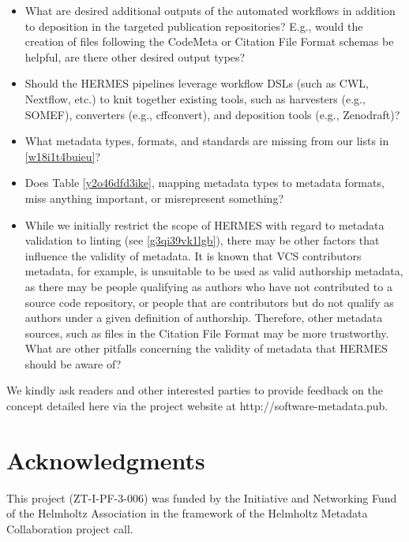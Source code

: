 \documentclass{article}
\begin{document}
\begin{itemize}  
\item What are desired additional outputs of the automated workflows in addition to deposition in the targeted publication repositories? E.g., would the creation of files following the CodeMeta or Citation File Format schemas be helpful, are there other desired output types?


\item Should the HERMES pipelines leverage workflow DSLs (such as CWL, Nextflow, etc.) to knit together existing tools, such as harvesters (e.g., SOMEF), converters (e.g., cffconvert), and deposition tools (e.g., Zenodraft)?


\item What metadata types, formats, and standards are missing from our lists in \ref{w18i1t4buieu}?


\item Does Table \ref{y2o46dfd3ike}, mapping metadata types to metadata formats, miss anything important, or misrepresent something?


\item While we initially restrict the scope of HERMES with regard to metadata validation to linting (see \ref{g3qi39vk1lgb}), there may be other factors that influence the validity of metadata. It is known that VCS contributors metadata, for example, is unsuitable to be used as valid authorship metadata, as there may be people qualifying as authors who have not contributed to a source code repository, or people that are contributors but do not qualify as authors under a given definition of authorship. Therefore, other metadata sources, such as files in the Citation File Format may be more trustworthy. What are other pitfalls concerning the validity of metadata that HERMES should be aware of?


\end{itemize}We kindly ask readers and other interested parties to provide feedback on the concept detailed here via the project website at http://software-metadata.pub.



\section{Acknowledgments}\label{giyko1j}
This project (ZT-I-PF-3-006) was funded by the Initiative and Networking Fund of the Helmholtz Association in the framework of the Helmholtz Metadata Collaboration project call.
\end{document}
